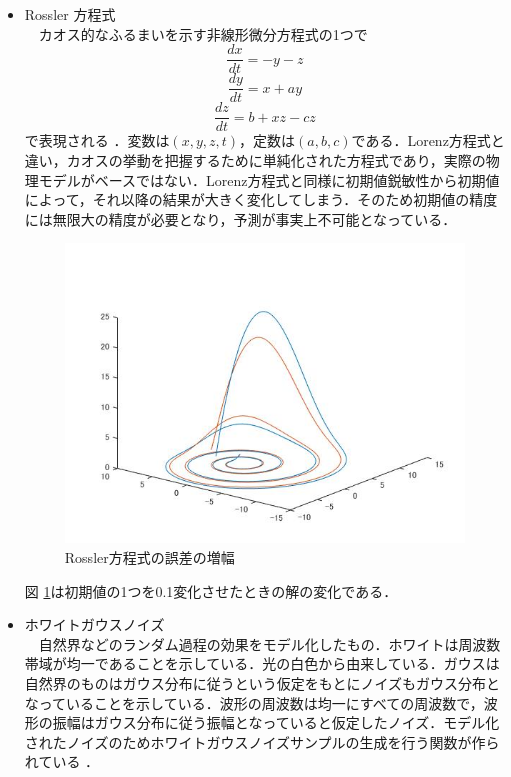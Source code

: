 \documentclass[autodetect-engine,dvipdfmx-if-dvi,ja=standard,a4paper,11pt]{bxjsarticle} %
\begin{document}
\begin{itemize}
\item Rossler 方程式\\%
　カオス的なふるまいを示す非線形微分方程式の1つで
\begin{equation}
\frac{dx}{dt}=-y-z
\end{equation}
\begin{equation}
\frac{dy}{dt}=x+ay
\end{equation}
\begin{equation}
\frac{dz}{dt}=b+xz-cz
\end{equation}
で表現される \cite{re} ．変数は$(x,y,z,t)$，定数は$(a,b,c)$である．Lorenz方程式と違い，カオスの挙動を把握するために単純化された方程式であり，実際の物理モデルがベースではない．Lorenz方程式と同様に初期値鋭敏性から初期値によって，それ以降の結果が大きく変化してしまう．そのため初期値の精度には無限大の精度が必要となり，予測が事実上不可能となっている．

\begin{figure}[H]%
\begin{center}
\includegraphics[width=.4\textwidth]{Rossler_result.jpg}
\end{center}
\caption{Rossler方程式の誤差の増幅}%
\label{fig:rossler}
\end{figure}

図 \ref{fig:rossler}は初期値の1つを0.1変化させたときの解の変化である．\\


\item ホワイトガウスノイズ\\%
　自然界などのランダム過程の効果をモデル化したもの．ホワイトは周波数帯域が均一であることを示している．光の白色から由来している．ガウスは自然界のものはガウス分布に従うという仮定をもとにノイズもガウス分布となっていることを示している．波形の周波数は均一にすべての周波数で，波形の振幅はガウス分布に従う振幅となっていると仮定したノイズ．モデル化されたノイズのためホワイトガウスノイズサンプルの生成を行う関数が作られている \cite{wgn} ．\\


\end{itemize}
\end{document}
